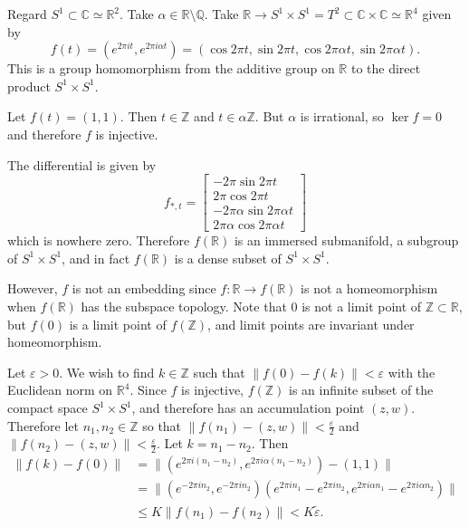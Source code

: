 \begin{xmpl}
Regard $S^1 \subset \mathbb{C} \simeq \mathbb{R}^2$. Take
$\alpha \in \mathbb{R} \setminus \mathbb{Q}$. Take
$\mathbb{R} \to S^1 \times S^1 = T^2 \subset \mathbb{C} \times
\mathbb{C} \simeq \mathbb{R}^4$ given by
$$
  f(t)
= (e^{2 \pi i t}, e^{2 \pi i \alpha t})
= (\cos 2 \pi t, \sin 2 \pi t, \cos 2 \pi \alpha t, \sin 2 \pi \alpha t).
$$
This is a group homomorphism from the additive group on $\mathbb{R}$ to the direct
product $S^1 \times S^1$.

Let $f(t) = (1, 1)$. Then $t \in \mathbb{Z}$ and $t \in \alpha
\mathbb{Z}$. But $\alpha$ is irrational, so $\ker f = 0$ and therefore
$f$ is injective.

The differential is given by
$$
  f_{\ast, t}
= \left[
    \begin{array}{r}
      -2 \pi \sin 2 \pi t \\
       2 \pi \cos 2 \pi t \\
      -2 \pi \alpha \sin 2 \pi \alpha t \\
       2 \pi \alpha \cos 2 \pi \alpha t
    \end{array}
  \right]
$$
which is nowhere zero. Therefore $f(\mathbb{R})$ is an immersed
submanifold, a subgroup of $S^1 \times S^1$, and in fact
$f(\mathbb{R})$ is a dense subset of $S^1 \times S^1$.

However, $f$ is not an embedding since
$f: \mathbb{R} \to f(\mathbb{R})$ is not a homeomorphism when
$f(\mathbb{R})$ has the subspace topology. Note that $0$ is not a
limit point of $\mathbb{Z} \subset \mathbb{R}$, but $f(0)$ is a limit
point of $f(\mathbb{Z})$, and limit points are invariant under
homeomorphism.

Let $\varepsilon > 0$. We wish to find $k \in \mathbb{Z}$ such that
$\| f(0) - f(k) \| < \varepsilon$ with the Euclidean norm on
$\mathbb{R}^4$. Since $f$ is injective, $f(\mathbb{Z})$ is an infinite
subset of the compact space $S^1 \times S^1$, and therefore has an
accumulation point $(z, w)$. Therefore let $n_1, n_2 \in \mathbb{Z}$
so that $\| f(n_1) - (z, w) \| < \frac{\varepsilon}{2}$ and
$\| f(n_2) - (z, w) \| < \frac{\varepsilon}{2}$. Let $k = n_1 -
n_2$. Then
\begin{align*}
   \| f(k) - f(0) \|
&= \| (e^{2 \pi i(n_1 - n_2)}, e^{2 \pi i \alpha (n_1 - n_2)})
    - (1, 1) \| \\
&= \| (e^{-2 \pi i n_2}, e^{-2 \pi i n_2})
      (e^{2 \pi i n_1} - e^{2 \pi i n_2},
       e^{2 \pi i \alpha n_1} - e^{2\pi i \alpha n_2}) \| \\
&\leq K\|f(n_1) - f(n_2)\|
 <    K \tilde{\varepsilon}.
\end{align*}
\end{xmpl}


